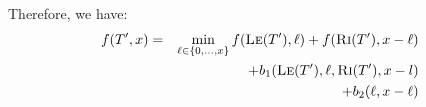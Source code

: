 \documentclass[9pt,twocolumn]{scrartcl}
\newcommand{\maciek}[1]{\textcolor{brown}{maciek: #1}}
\newcommand{\SubstrateNodes}{\ensuremath{V_S}}
\newcommand{\SubstrateNode}{\ensuremath{v}}
\newcommand{\Opt}{\ensuremath{Opt}}
\newcommand{\Uplink}{\ensuremath{\textsc{uplink}}}
\newcommand{\ChunkCount}{\ensuremath{\textsc{cis}}}
\newcommand{\capacity}{\emph{cap}}
\newcommand{\CostTrans}{\ensuremath{b_1}}
\newcommand{\CostCom}{\ensuremath{b_2}}
\newcommand{\Vms}{\ensuremath{n_V}}
\begin{document}
%

Therefore, we have:
\begin{eqnarray*}
f(T', x) &=& \min_{\ell \in \{0, \ldots, x\}}  f(\textsc{Le}(T'), {\ell}) + f(\textsc{Ri}(T'), x - {\ell}) \\
&&+ \CostTrans(\textsc{Le}(T'),{\ell},\textsc{Ri}(T'),x-l)\\ &&+ \CostCom({\ell},x-{\ell})\\
\end{eqnarray*}

\end{document}
